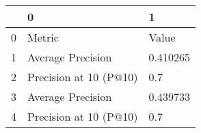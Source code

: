 \begin{tabular}{lll}
\toprule
{} &                       0 &         1 \\
\midrule
0 &                  Metric &     Value \\
1 &       Average Precision &  0.410265 \\
2 &  Precision at 10 (P@10) &       0.7 \\
3 &       Average Precision &  0.439733 \\
4 &  Precision at 10 (P@10) &       0.7 \\
\bottomrule
\end{tabular}
